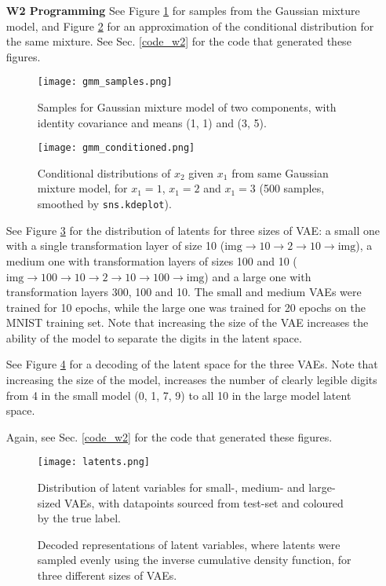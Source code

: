 \documentclass[11pt]{article} %
\begin{document}
\begin{enumerate}
\newpage
\item[\textbf{W2 Programming}] See Figure \ref{gmm-samples} for samples from the Gaussian mixture model, and Figure \ref{gmm-cond} for an approximation of the conditional distribution for the same mixture. See Sec. \ref{code_w2} for the code that generated these figures.

\begin{figure}[h!]
\center
  \texttt{[image: gmm\_samples.png]}
  \caption{Samples for Gaussian mixture model of two components, with identity covariance and means (1, 1) and (3, 5).}
  \label{gmm-samples}
\end{figure}
\begin{figure}[h!]
\center
  \texttt{[image: gmm\_conditioned.png]}
  \caption{Conditional distributions of $x_2$ given $x_1$ from same Gaussian mixture model, for $x_1=1$, $x_1=2$ and $x_1=3$ (500 samples, smoothed by \lstinline{sns.kdeplot}).}
  \label{gmm-cond}
\end{figure}

See Figure \ref{latent-vae} for the distribution of latents for three sizes of VAE: a small one with a single transformation layer of size 10 ($\textrm{img}\rightarrow10\rightarrow2\rightarrow10\rightarrow\textrm{img}$), a medium one with transformation layers of sizes 100 and 10 ($\textrm{img}\rightarrow100\rightarrow10\rightarrow2\rightarrow10\rightarrow100\rightarrow\textrm{img}$) and a large one with transformation layers 300, 100 and 10. The small and medium VAEs were trained for 10 epochs, while the large one was trained for 20 epochs on the MNIST training set. Note that increasing the size of the VAE increases the ability of the model to separate the digits in the latent space.

See Figure \ref{fig-vae} for a decoding of the latent space for the three VAEs. Note that increasing the size of the model, increases the number of clearly legible digits from 4 in the small model (0, 1, 7, 9) to all 10 in the large model latent space.

Again, see Sec. \ref{code_w2} for the code that generated these figures.
\begin{figure}[h]
\center
  \texttt{[image: latents.png]}
  \caption{Distribution of latent variables for small-, medium- and large-sized VAEs, with datapoints sourced from test-set and coloured by the true label.}
  \label{latent-vae}
\end{figure}

\begin{figure}[h!]
\center
  \hfil
  \hfil
  \caption{Decoded representations of latent variables, where latents were sampled evenly using the inverse cumulative density function, for three different sizes of VAEs.}
  \label{fig-vae}
\end{figure}


\newpage
\end{enumerate}
\end{document}

